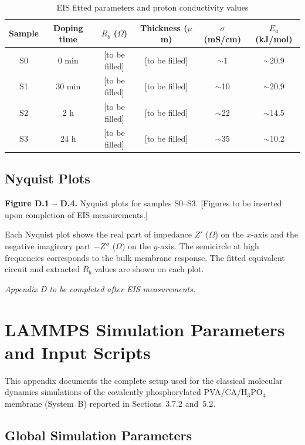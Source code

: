 \documentclass[12pt,a4paper]{report}
\begin{document}
\begin{table}[ht]
\centering
\caption{EIS fitted parameters and proton conductivity values}
\label{tab:eis-results}
\begin{tabular}{c c c c c c}
\toprule
Sample & Doping time & \(R_b\) (\(\Omega\)) & Thickness (\(\mu\)m) & \(\sigma\) (mS/cm) & \(E_a\) (kJ/mol) \\
\midrule
S0 & 0 min & [to be filled] & [to be filled] & \(\sim\)1 & \(\sim\)20.9 \\
S1 & 30 min & [to be filled] & [to be filled] & \(\sim\)10 & \(\sim\)20.9 \\
S2 & 2 h & [to be filled] & [to be filled] & \(\sim\)22 & \(\sim\)14.5 \\
S3 & 24 h & [to be filled] & [to be filled] & \(\sim\)35 & \(\sim\)10.2 \\
\bottomrule
\end{tabular}
\end{table}

\section{Nyquist Plots}

\textbf{Figure D.1 – D.4.} Nyquist plots for samples S0–S3. [Figures to be inserted upon completion of EIS measurements.]

Each Nyquist plot shows the real part of impedance \(Z'\) (\(\Omega\)) on the \(x\)-axis and the negative imaginary part \(-Z''\) (\(\Omega\)) on the \(y\)-axis. The semicircle at high frequencies corresponds to the bulk membrane response. The fitted equivalent circuit and extracted \(R_b\) values are shown on each plot.

\vspace{2cm}
\noindent \textit{Appendix D to be completed after EIS measurements.}

\chapter{LAMMPS Simulation Parameters and Input Scripts}

This appendix documents the complete setup used for the classical 
molecular dynamics simulations of the covalently phosphorylated 
PVA/CA/H\(_3\)PO\(_4\) membrane (System~B) reported in 
Sections~3.7.2 and~5.2.

\section{Global Simulation Parameters}
\end{document}
